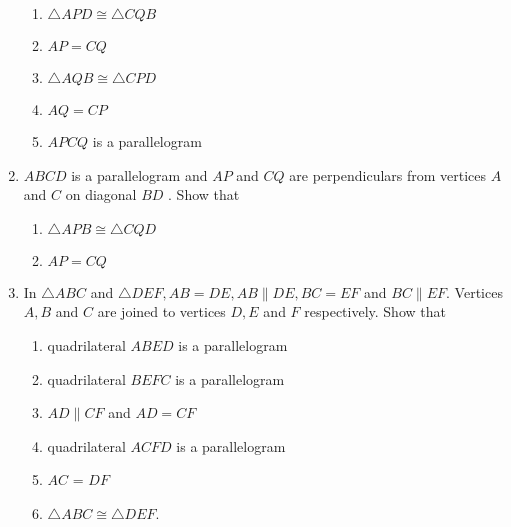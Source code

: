 \begin{enumerate}[label=\arabic*.,ref=\thesubsection.\theenumi]
\begin{enumerate}
 \item  $\triangle  APD  \cong   \triangle  CQB$ 
\item $AP = CQ$ \item  $\triangle  AQB  \cong   \triangle  CPD$ 
\item $AQ = CP$ 
\item $APCQ$ is a parallelogram
\end{enumerate}
\item $ABCD$ is a parallelogram and $AP$ and $CQ$ are perpendiculars from vertices $A$ and $C$ on diagonal $BD$ . Show that 
\begin{enumerate} 
\item  $\triangle  APB  \cong   \triangle  CQD $ 
\item $AP = CQ$
\end{enumerate}
%
\item In  $\triangle  ABC$ and  $\triangle  DEF, AB = DE, AB  \parallel  DE, BC = EF$ and $BC  \parallel  EF$. Vertices $A, B$ and $C$ are joined to vertices $D, E$ and $F$ respectively. Show that 
\begin{enumerate}
\item quadrilateral $ABED$ is a parallelogram 
\item quadrilateral $BEFC$ is a parallelogram 
\item $AD  \parallel  CF$ and $AD = CF$ 
\item quadrilateral $ACFD$ is a parallelogram 
\item $AC$ = $DF$ 
\item  $\triangle  ABC  \cong   \triangle  DEF$.
%
\end{enumerate}


\end{enumerate}
